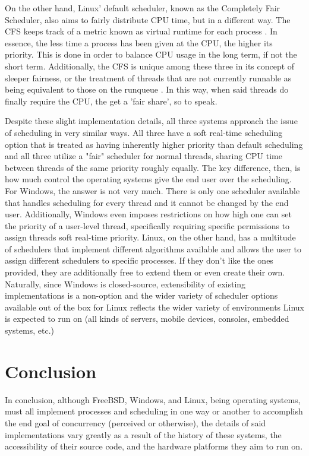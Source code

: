\documentclass[onecolumn, draftclsnofoot,10pt, compsoc]{IEEEtran}
\begin{document}
On the other hand, Linux' default scheduler, known as the Completely Fair Scheduler, also aims to fairly distribute CPU time, but in a different way. The CFS keeps track of a metric known as virtual runtime for each process \cite{CFS}. In essence, the less time a process has been given at the CPU, the higher its priority. This is done in order to balance CPU usage in the long term, if not the short term. Additionally, the CFS is unique among these three in its concept of sleeper fairness, or the treatment of threads that are not currently runnable as being equivalent to those on the runqueue \cite{CFS}. In this way, when said threads do finally require the CPU, the get a 'fair share', so to speak. 

Despite these slight implementation details, all three systems approach the issue of scheduling in very similar ways. All three have a soft real-time scheduling option that is treated as having inherently higher priority than default scheduling and all three utilize a "fair" scheduler for normal threads, sharing CPU time between threads of the same priority roughly equally. The key difference, then, is how much control the operating systems give the end user over the scheduling. For Windows, the answer is not very much. There is only one scheduler available that handles scheduling for every thread and it cannot be changed by the end user. Additionally, Windows even imposes restrictions on how high one can set the priority of a user-level thread, specifically requiring specific permissions to assign threads soft real-time priority. Linux, on the other hand, has a multitude of schedulers that implement different algorithms available and allows the user to assign different schedulers to specific processes. If they don't like the ones provided, they are additionally free to extend them or even create their own. Naturally, since Windows is closed-source, extensibility of existing implementations is a non-option and the wider variety of scheduler options available out of the box for Linux reflects the wider variety of environments Linux is expected to run on (all kinds of servers, mobile devices, consoles, embedded systems, etc.)

\section{Conclusion}
In conclusion, although FreeBSD, Windows, and Linux, being operating systems, must all implement processes and scheduling in one way or another to accomplish the end goal of concurrency (perceived or otherwise), the details of said implementations vary greatly as a result of the history of these systems, the accessibility of their source code, and the hardware platforms they aim to run on.
\newpage


\end{document}
